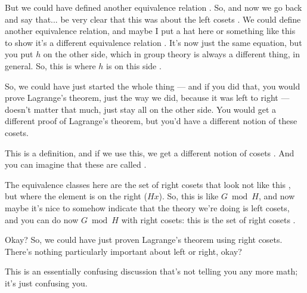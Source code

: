 \begin{speech}[00:03:38 - 00:05:36]
But we could have defined another equivalence relation . So, and now we go back and say that... be very clear that this was about the left cosets . We could define another equivalence relation, and maybe I put a hat here or something like this to show it's a different equivalence relation . It's now just the same equation, but you put $h$ on the other side, which in group theory is always a different thing, in general. So, this is where $h$ is on this side .

So, we could have just started the whole thing --- and if you did that, you would prove Lagrange's theorem, just the way we did, because it was left to right --- doesn't matter that much, just stay all on the other side. You would get a different proof of Lagrange's theorem, but you'd have a different notion of these cosets.

This is a definition, and if we use this, we get a different notion of cosets . And you can imagine that these are called .

The equivalence classes here are the set of right cosets that look not like this , but where the element is on the right ($Hx$). So, this is like $G \bmod H$, and now maybe it's nice to somehow indicate that the theory we're doing is left cosets, and you can do now $G \bmod H$ with right cosets: this is the set of right cosets .

Okay? So, we could have just proven Lagrange's theorem using right cosets. There's nothing particularly important about left or right, okay?

This is an essentially confusing discussion that's not telling you any more math; it's just confusing you.
\end{speech}

